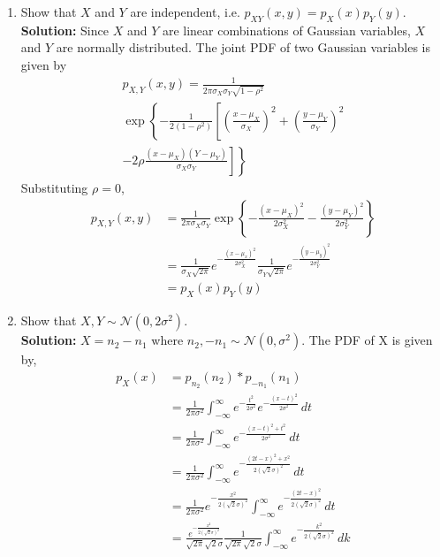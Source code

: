\documentclass[journal,8pt,onecolumn]{IEEEtran}
\providecommand{\brak}[1]{\ensuremath{\left(#1\right)}}
\providecommand{\cbrak}[1]{\ensuremath{\left\{#1\right\}}}
\newcommand{\solution}{\noindent \textbf{Solution: }}
\providecommand{\gauss}[2]{\mathcal{N}\ensuremath{\left(#1,#2\right)}}
\begin{document}
\begin{enumerate}
\begin{enumerate}[label=(\alph{enumii})]
\item Show that $X$ and $Y$ are independent, i.e. $p_{XY}(x,y) = p_{X}(x)p_{Y}(y)$.\\
\solution Since $X$ and $Y$ are linear combinations of Gaussian variables, $X$ and $Y$ are normally distributed. The joint PDF of two Gaussian %
variables is given by
\begin{multline}
	\label{eq:biv_gauss_gen}
	p_{X,Y}\brak{x,y} = \frac{1}{2\pi\sigma_X\sigma_Y\sqrt{1-\rho^2}}\\
	\exp\left\{-\frac{1}{2\brak{1-\rho^2}}\left[\brak{\frac{x-\mu_X}{\sigma_X}}^2+\brak{\frac{y-\mu_Y}{\sigma_Y}}^2\right.\right.\\
	\left.\left.-2\rho\frac{\brak{x-\mu_X}\brak{Y-\mu_Y}}{\sigma_X\sigma_Y}\right]\right\}
\end{multline}
Substituting $\rho = 0$,  
\begin{align}
	p_{X,Y}\brak{x,y} &= \frac{1}{2\pi\sigma_X\sigma_Y}\exp\cbrak{-\frac{\brak{x-\mu_X}^2}{2\sigma_X^2}-\frac{\brak{y-\mu_Y}^2}{2\sigma_Y^2}}\\
	&= \frac{1}{\sigma_X\sqrt{2\pi}}e^{-\frac{\brak{x-\mu_x}^2}{2\sigma_X^2}} \frac{1}{\sigma_Y\sqrt{2\pi}}e^{-\frac{\brak{y-\mu_y}^2}{2\sigma_Y^2}}\\
	&= p_X\brak{x} p_Y\brak{y}
\end{align}
\item Show that $X,Y \sim \mathcal{N}\brak{0,2\sigma^2}$.\\
\solution $X = n_2-n_1$ where $n_2, -n_1 \sim \gauss{0}{\sigma^2}$. The PDF of X is given by,
\begin{align}
	\nonumber
	p_X(x) &= p_{n_2}(n_2) \ast p_{-n_1}(n_1)\\\nonumber
	&= \frac{1}{2\pi\sigma^2}\int_{-\infty}^{\infty} e^{-\frac{t^2}{2\sigma^2}}e^{-\frac{(x-t)^2}{2\sigma^2}}  \,dt\\\nonumber
	&= \frac{1}{2\pi\sigma^2}\int_{-\infty}^{\infty} e^{-\frac{(x-t)^2+t^2}{2\sigma^2}}  \,dt\\\nonumber
	&= \frac{1}{2\pi\sigma^2}\int_{-\infty}^{\infty} e^{-\frac{(2t-x)^2+x^2}{2(\sqrt{2}\sigma)^2}}  \,dt\\\nonumber
	&= \frac{1}{2\pi\sigma^2}e^{-\frac{x^2}{2(\sqrt{2}\sigma)^2}}\int_{-\infty}^{\infty} e^{-\frac{(2t-x)^2}{2(\sqrt{2}\sigma)^2}}  \,dt\\\nonumber
	&= \frac{e^{-\frac{x^2}{2(\sqrt{2}\sigma)^2}}}{\sqrt{2\pi}\sqrt{2}\sigma} \frac{1}{\sqrt{2\pi}\sqrt{2}\sigma}\int_{-\infty}^{\infty} e^{-\frac{k^2}{2(\sqrt{2}\sigma)^2}}  \,dk\\

\end{align}
\end{enumerate}
\end{enumerate}
\end{document}
